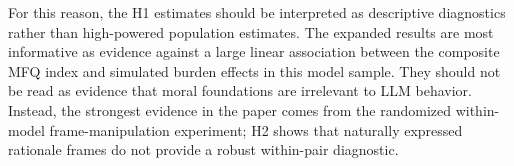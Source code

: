 \documentclass[11pt]{article}
\begin{document}
For this reason, the H1 estimates should be interpreted as descriptive diagnostics rather than high-powered population estimates. The expanded results are most informative as evidence against a large linear association between the composite MFQ index and simulated burden effects in this model sample. They should not be read as evidence that moral foundations are irrelevant to LLM behavior. Instead, the strongest evidence in the paper comes from the randomized within-model frame-manipulation experiment; H2 shows that naturally expressed rationale frames do not provide a robust within-pair diagnostic.

\ifdefined\vslaMainDocument
\else


\fi
\end{document}
